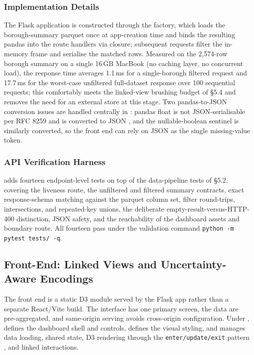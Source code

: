 \subsubsection{Implementation Details}
The Flask application is constructed through the  factory, which loads the borough-summary parquet once at app-creation time and binds the resulting pandas  into the route handlers via closure; subsequent requests filter the in-memory frame and serialise the matched rows. Measured on the 2{,}574-row borough summary on a single 16\,GB MacBook (no caching layer, no concurrent load), the response time averages 1.1\,ms for a single-borough filtered request and 17.7\,ms for the worst-case unfiltered full-dataset response over 100 sequential requests; this comfortably meets the linked-view brushing budget of \S5.4 and removes the need for an external store at this stage. Two pandas-to-JSON conversion issues are handled centrally in : pandas float  is not JSON-serialisable per RFC 8259 and is converted to JSON , and the nullable-boolean  sentinel  is similarly converted, so the front end can rely on JSON  as the single missing-value token.

\subsubsection{API Verification Harness}
 adds fourteen endpoint-level tests on top of the data-pipeline tests of \S5.2, covering the liveness route, the unfiltered and filtered summary contracts, exact response-schema matching against the parquet column set, filter round-trips, intersections, and repeated-key unions, the deliberate empty-result-versus-HTTP-400 distinction, JSON  safety, and the reachability of the dashboard assets and boundary route. All fourteen pass under the validation command \texttt{python -m pytest tests/ -q}.

\subsection{Front-End: Linked Views and Uncertainty-Aware Encodings}

The front end is a static D3 module \cite{bostock2011} served by the Flask app rather than a separate React/Vite build. The interface has one primary screen, the data are pre-aggregated, and same-origin serving avoids cross-origin configuration. Under ,  defines the dashboard shell and controls,  defines the visual styling, and  manages data loading, shared state, D3 rendering through the \texttt{enter/update/exit} pattern \cite{bostock2011, heer2010}, and linked interactions.

